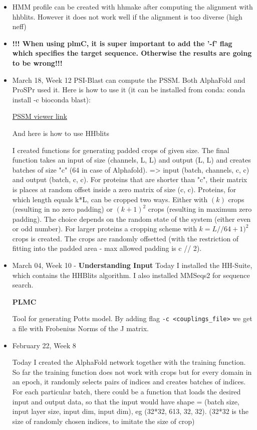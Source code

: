 \documentclass[11pt]{article}
\begin{document}
\begin{itemize}
    \item HMM profile can be created with hhmake after computing the alignment with hhblits. However it does not work well if the alignment is too diverse (high neff)
    
    \item \textbf{!!! When using plmC, it is super important to add the '-f' flag which specifies the target sequence. Otherwise the results are going to be wrong!!!}
    
    \item March 18, Week 12
    PSI-Blast can compute the PSSM. Both AlphaFold and ProSPr used it. Here is how to use it (it can be installed from conda: conda install -c bioconda blast):
    
    \href{https://www.ncbi.nlm.nih.gov/Class/Structure/pssm/pssm_viewer.cgi}{PSSM viewer link}
    
    And here is how to use HHblits
    
    
    
    I created functions for generating padded crops of given size. The final function takes an input of size (channels, L, L) and output (L, L) and creates batches of size "c" (64 in case of Alphafold). => input (batch, channels, c, c) and output (batch, c, c). For proteins that are shorter than "c", their matrix is places at random offset inside a zero matrix of size (c, c). Proteins, for which length equals k*L, can be cropped two ways. Either with $(k)$ crops (resulting in no zero padding) or $(k+1)^2$ crops (resulting in maximum zero padding). The choice depends on the random state of the system (either even or odd number). For larger proteins a cropping scheme with $k = L // 64 + 1)^2$ crops is created. The crops are randomly offsetted (with the restriction of fitting into the padded area - max allowed padding is c // 2).
    
    \item March 04, Week 10 - \textbf{Understanding Input}
    Today I installed the HH-Suite, which contains the HHBlits algorithm. I also installed MMSeqs2 for sequence search.
    
    \textbf{PLMC}
    
    Tool for generating Potts model. By adding flag \texttt{-c <couplings\_file>} we get a file with Frobenius Norms of the J matrix.
    \item February 22, Week 8
    
    Today I created the AlphaFold network together with the training function. So far the training function does not work with crops but for every domain in an epoch, it randomly selects pairs of indices and creates batches of indices. For each particular batch, there could be a function that loads the desired input and output data, so that the input would have shape = (batch size, input layer size, input dim, input dim), eg (32*32, 613, 32, 32). (32*32 is the size of randomly chosen indices, to imitate the size of crop)
    

\end{itemize}
\end{document}
